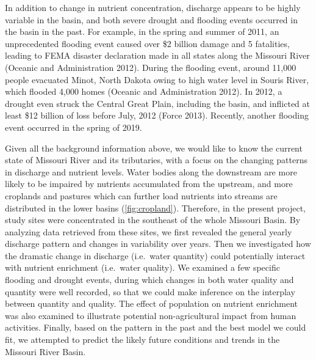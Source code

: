 \documentclass[12pt,]{article}
\begin{document}
In addition to change in nutrient concentration, discharge appears to be
highly variable in the basin, and both severe drought and flooding
events occurred in the basin in the past. For example, in the spring and
summer of 2011, an unprecedented flooding event caused over \$2 billion
damage and 5 fatalities, leading to FEMA disaster declaration made in
all states along the Missouri River (Oceanic and Administration 2012).
During the flooding event, around 11,000 people evacuated Minot, North
Dakota owing to high water level in Souris River, which flooded 4,000
homes (Oceanic and Administration 2012). In 2012, a drought even struck
the Central Great Plain, including the basin, and inflicted at least
\$12 billion of loss before July, 2012 (Force 2013). Recently, another
flooding event occurred in the spring of 2019.

Given all the background information above, we would like to know the
current state of Missouri River and its tributaries, with a focus on the
changing patterns in discharge and nutrient levels. Water bodies along
the downstream are more likely to be impaired by nutrients accumulated
from the upstream, and more croplands and pastures which can further
load nutrients into streams are distributed in the lower basins
(\autoref{fig:cropland}). Therefore, in the present project, study sites
were concentrated in the southeast of the whole Missouri Basin. By
analyzing data retrieved from these sites, we first revealed the general
yearly discharge pattern and changes in variability over years. Then we
investigated how the dramatic change in discharge (i.e.~water quantity)
could potentially interact with nutrient enrichment (i.e.~water
quality). We examined a few specific flooding and drought events, during
which changes in both water quality and quantity were well recorded, so
that we could make inference on the interplay between quantity and
quality. The effect of population on nutrient enrichment was also
examined to illustrate potential non-agricultural impact from human
activities. Finally, based on the pattern in the past and the best model
we could fit, we attempted to predict the likely future conditions and
trends in the Missouri River Basin.
\end{document}
